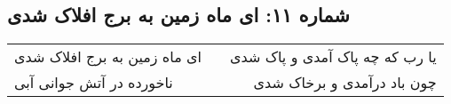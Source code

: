 \begin{center}
\section*{شماره ۱۱: ای ماه زمین به برج افلاک شدی}
\label{sec:011}
\begin{longtable}{l p{0.5cm} r}
ای ماه زمین به برج افلاک شدی
&&
یا رب که چه پاک آمدی و پاک شدی
\\
ناخورده در آتش جوانی آبی
&&
چون باد درآمدی و برخاک شدی
\\
\end{longtable}
\end{center}
